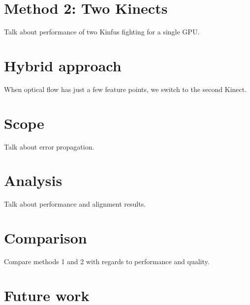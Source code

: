 \documentclass[msc, a4paper, classic, en]{ufbathesis}
\begin{document}
\section{Method 2: Two Kinects}
\label{sec:method2}
Talk about performance of two Kinfus fighting for a single GPU.
\section{Hybrid approach}
When optical flow has just a few feature points, we switch to the second Kinect.

\label{sec:results}
\section{Scope}
Talk about error propagation.
\section{Analysis}
Talk about performance and alignment results.
\section{Comparison}
Compare methods 1 and 2 with regards to performance and quality.

\section{Future work}

\backmatter

\appendix

% 
% 
% 





\end{document}

